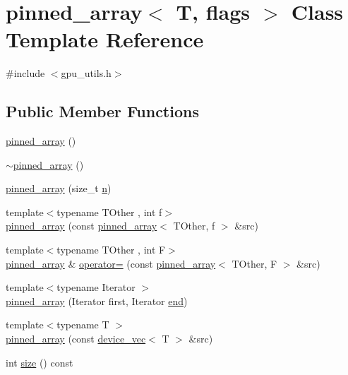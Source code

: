 \hypertarget{classpinned__array}{}\section{pinned\+\_\+array$<$ T, flags $>$ Class Template Reference}
\label{classpinned__array}


{\ttfamily \#include $<$gpu\+\_\+utils.\+h$>$}

\subsection*{Public Member Functions}
\begin{DoxyCompactItemize}
\item 
\hyperlink{classpinned__array_a00c76b52b2cd9ee62a581db5c6bff216}{pinned\+\_\+array} ()
\item 
\hyperlink{classpinned__array_afb2330e858f4b9a1288be6e6ddbedfbd}{$\sim$pinned\+\_\+array} ()
\item 
\hyperlink{classpinned__array_aec9bbda6eb87c91b5b139f5732b3d56c}{pinned\+\_\+array} (size\+\_\+t \hyperlink{classpinned__array_a8038d2f3dbfca5173ef9e4727cbac721}{n})
\item 
{\footnotesize template$<$typename T\+Other , int f$>$ }\\\hyperlink{classpinned__array_af38f986c689bfcb469a51a9a207b7e6d}{pinned\+\_\+array} (const \hyperlink{classpinned__array}{pinned\+\_\+array}$<$ T\+Other, f $>$ \&src)
\item 
{\footnotesize template$<$typename T\+Other , int F$>$ }\\\hyperlink{classpinned__array}{pinned\+\_\+array} \& \hyperlink{classpinned__array_ae597a3ac693ae9b714c9ed6b03f94993}{operator=} (const \hyperlink{classpinned__array}{pinned\+\_\+array}$<$ T\+Other, F $>$ \&src)
\item 
{\footnotesize template$<$typename Iterator $>$ }\\\hyperlink{classpinned__array_a11eaec4e43a52f844b08646bcd5c166e}{pinned\+\_\+array} (Iterator first, Iterator \hyperlink{classpinned__array_ae390c83407b010c28eb33fa19448c9a1}{end})
\item 
{\footnotesize template$<$typename T $>$ }\\\hyperlink{classpinned__array_a22bae9fe08fa2e926281adcf920882e3}{pinned\+\_\+array} (const \hyperlink{classdevice__vec}{device\+\_\+vec}$<$ T $>$ \&src)
\item 
int \hyperlink{classpinned__array_aa57ce93b5413ac43025d474fcff85855}{size} () const 

\end{DoxyCompactItemize}
